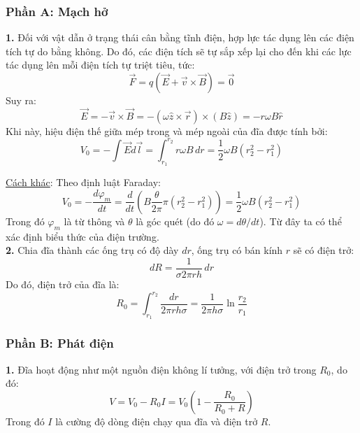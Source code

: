 \subsubsection*{Phần A: Mạch hở}
\noindent\textbf{1.} Đối với vật dẫn ở trạng thái cân bằng tĩnh điện, hợp lực tác dụng lên các điện tích tự do bằng không. Do đó, các điện tích sẽ tự sắp xếp lại cho đến khi các lực tác dụng lên mỗi điện tích tự triệt tiêu, tức:
\begin{equation*}
  \vec{F} = q\left( \vec{E} + \vec{v} \times \vec{B} \right) = \vec{0}
\end{equation*}
Suy ra:
\begin{equation*}
  \vec{E} = -\vec{v} \times \vec{B} = -(\omega \hat{z} \times \vec{r}) \times (B \hat{z}) = -r \omega B \hat{r}
\end{equation*}
Khi này, hiệu điện thế giữa mép trong và mép ngoài của đĩa được tính bởi:
\begin{equation*}
  V_0 = -\int \vec{E}  d\vec{l} = \int_{r_1}^{r_2} r\omega B \, dr = \frac{1}{2} \omega B \left( r_2^2 - r_1^2 \right)
\end{equation*}

\noindent\underline{Cách khác}: Theo định luật Faraday:
\begin{equation*}
  V_0 = -\frac{d\varphi_m}{dt} = \frac{d}{dt} \left( B  \frac{\theta}{2\pi} \pi (r_2^2 - r_1^2) \right) = \frac{1}{2} \omega B (r_2^2 - r_1^2)
\end{equation*}
Trong đó $\varphi_m$ là từ thông và $\theta$ là góc quét (do đó $\omega = d\theta/dt$). Từ đây ta có thể xác định biểu thức của điện trường.\\

\noindent\textbf{2.} Chia đĩa thành các ống trụ có độ dày $dr$, ống trụ có bán kính $r$ sẽ có điện trở:
\begin{equation*}
  dR = \frac{1}{\sigma  2\pi r h} \, dr
\end{equation*}
Do đó, điện trở của đĩa là:
\begin{equation*}
  R_0 = \int_{r_1}^{r_2} \frac{dr}{2\pi r h \sigma} = \frac{1}{2\pi h \sigma} \ln \frac{r_2}{r_1}
\end{equation*}

\subsubsection*{Phần B: Phát điện}
\noindent\textbf{1.} Đĩa hoạt động như một nguồn điện không lí tưởng, với điện trở trong $R_0$, do đó:
\begin{equation*}
  V = V_0 - R_0 I = V_0 \left(1 - \frac{R_0}{R_0 + R} \right)
\end{equation*}
Trong đó $I$ là cường độ dòng điện chạy qua đĩa và điện trở $R$.\\

